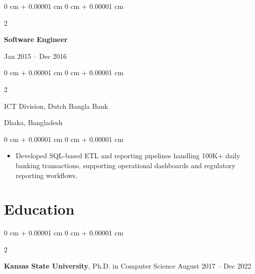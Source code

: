 \documentclass[10pt, letterpaper]{article}
\newenvironment{highlights}{
    \begin{itemize}[
        topsep=0.10 cm,
        parsep=0.10 cm,
        partopsep=0pt,
        itemsep=0pt,
        leftmargin=0 cm + 10pt
    ]
}{
    \end{itemize}
} %
\newenvironment{onecolentry}{
    \begin{adjustwidth}{
        0 cm + 0.00001 cm
    }{
        0 cm + 0.00001 cm
    }
}{
    \end{adjustwidth}
} %
\newenvironment{twocolentry}[2][]{
    \onecolentry
    \def\secondColumn{#2}
    \setcolumnwidth{\fill, 4.5 cm}
    \begin{paracol}{2}
}{
    \switchcolumn \raggedleft \secondColumn
    \end{paracol}
    \endonecolentry
} %
\begin{document}
    \vspace{0.1 cm}
    \begin{twocolentry}{Jan 2015 -- Dec 2016}
        \textbf{Software Engineer}
    \end{twocolentry}
    \begin{twocolentry}{Dhaka, Bangladesh}
       ICT Division, Dutch Bangla Bank
    \end{twocolentry}

    \begin{onecolentry}
        \begin{highlights}
            \item Developed SQL-based ETL and reporting pipelines handling 100K+ daily banking transactions, supporting operational dashboards and regulatory reporting workflows.
        \end{highlights}
    \end{onecolentry}
    

\section{Education}
    
        \begin{twocolentry}{
            August 2017 – Dec 2022
        }
            \textbf{Kansas State University}, Ph.D. in Computer Science\end{twocolentry}

\end{document}
